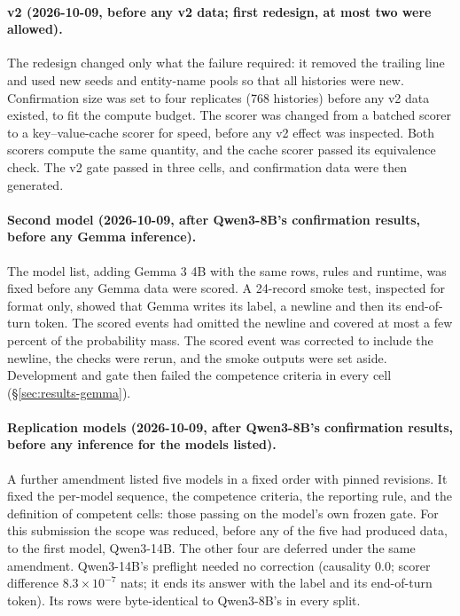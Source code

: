 \paragraph{v2 (2026-10-09, before any v2 data; first redesign, at most two were allowed).} The redesign changed only what the failure
required: it removed the trailing  line and used new seeds and entity-name pools so that all
histories were new. Confirmation size was set to four replicates (768 histories) before any v2 data
existed, to fit the compute budget. The scorer was changed from a batched scorer to a key--value-cache
scorer for speed, before any v2 effect was inspected. Both scorers compute the same quantity, and the
cache scorer passed its equivalence check. The v2 gate passed in three cells, and confirmation data were
then generated.

\paragraph{Second model (2026-10-09, after Qwen3-8B's confirmation results, before any Gemma inference).}
The model list, adding Gemma 3 4B with the same rows, rules and runtime, was fixed before any Gemma data
were scored. A 24-record smoke test, inspected for format only, showed that
Gemma writes its label, a newline and then its end-of-turn token. The scored events had omitted the
newline and covered at most a few percent of the probability mass. The scored event was corrected to include the
newline, the checks were rerun, and the smoke outputs were set aside. Development and gate then failed the
competence criteria in every cell (\S\ref{sec:results-gemma}).

\paragraph{Replication models (2026-10-09, after Qwen3-8B's confirmation results, before any inference
for the models listed).} A further amendment listed
five models in a fixed order with pinned revisions. It fixed the per-model sequence, the competence
criteria, the reporting rule, and the definition of competent cells: those passing on the model's own
frozen gate. For this submission the scope was reduced, before any of the five had produced data, to the
first model, Qwen3-14B. The other four are deferred under the same amendment. Qwen3-14B's preflight needed
no correction (causality 0.0; scorer difference $8.3\times10^{-7}$ nats; it ends its answer with the
label and its end-of-turn token). Its rows were byte-identical to Qwen3-8B's in every split.

